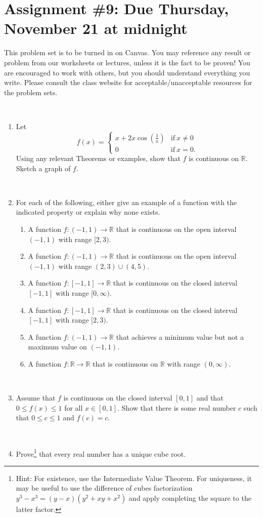\documentclass[12pt]{amsart}
\newcommand{\R}{\mathbb{R}}
\newcommand{\showsol}[1]{\def\displaysol{#1}}
\begin{document}
\showsol{1}
	
	\thispagestyle{empty}
	
	\section*{Assignment \#9: Due Thursday, November 21 at midnight}
	
	This problem set is to be turned in on Canvas. You may reference any result or problem from our worksheets or lectures, unless it is the fact to be proven! You are encouraged to work with others, but you should understand everything you write. Please consult the class website for acceptable/unacceptable resources for the problem sets.
	
	\
	

\begin{enumerate}

\item Let 
\[ f(x) = \begin{cases}  x + 2 x \cos\left(\frac{1}{x}\right) & \text{if} \ x\neq 0 \\ 
0 & \text{if} \ x = 0.\end{cases}\]
 Using any relevant Theorems or examples, show that $f$ is continuous on $\R$. Sketch a graph of $f$.


\

\item For each of the following, either give an example of a function with the indicated property or explain why none exists.
\begin{enumerate}
\item A function $f:(-1,1)\to \R$ that is continuous on the open interval $(-1,1)$  with range $[2,3)$.
\item A function $f:(-1,1)\to \R$ that is continuous on the open interval $(-1,1)$ with range ${(2,3) \cup (4,5)}$.
\item A function $f:[-1,1]\to \R$ that is continuous on the closed interval $[-1,1]$ with range $[0,\infty)$.
\item A function $f:[-1,1]\to \R$ that is continuous on the closed interval $[-1,1]$ with range $[2,3)$.
\item A function $f:(-1,1)\to \R$ that achieves a minimum value but not a maximum value on $(-1,1)$.
\item A function $f:\R\to \R$ that is continuous on $\R$ with range $(0,\infty)$.
\end{enumerate}

\

\item Assume that $f$ is continuous on the closed interval $[0,1]$ and that $0\leq f(x) \leq 1$ for all $x\in [0,1]$. Show that there is some real number $c$ such that $0\leq c \leq 1$ and $f(c)=c$.

\


\item Prove\footnote{Hint: For existence, use the Intermediate Value Theorem. For uniqueness, it may be useful to use the difference of cubes factorization $y^3 - x^3  = (y-x)(y^2+xy+x^2)$ and apply completing the square to the latter factor.}  that every real number has a unique cube root.


\end{enumerate}
\end{document}
